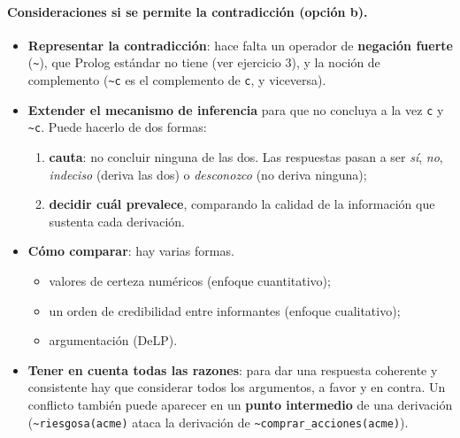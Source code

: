 \documentclass[11pt,a4paper]{article}
\newcommand{\nf}{\textasciitilde}
\begin{document}
\paragraph{Consideraciones si se permite la contradicción (opción b).}
\begin{itemize}
  \item \textbf{Representar la contradicción}: hace falta un operador de \textbf{negación fuerte} (\texttt{\nf}), que Prolog estándar no tiene (ver ejercicio 3), y la noción de complemento (\texttt{\nf c} es el complemento de \texttt{c}, y viceversa).
  \item \textbf{Extender el mecanismo de inferencia} para que no concluya a la vez \texttt{c} y \texttt{\nf c}. Puede hacerlo de dos formas:
  \begin{enumerate}
    \item \textbf{cauta}: no concluir ninguna de las dos. Las respuestas pasan a ser \textit{sí}, \textit{no}, \textit{indeciso} (deriva las dos) o \textit{desconozco} (no deriva ninguna);
    \item \textbf{decidir cuál prevalece}, comparando la calidad de la información que sustenta cada derivación.
  \end{enumerate}
  \item \textbf{Cómo comparar}: hay varias formas.
  \begin{itemize}
    \item valores de certeza numéricos (enfoque cuantitativo);
    \item un orden de credibilidad entre informantes (enfoque cualitativo);
    \item argumentación (DeLP).
  \end{itemize}
  \item \textbf{Tener en cuenta todas las razones}: para dar una respuesta coherente y consistente hay que considerar todos los argumentos, a favor y en contra. Un conflicto también puede aparecer en un \textbf{punto intermedio} de una derivación (\texttt{\nf riesgosa(acme)} ataca la derivación de \texttt{\nf comprar\_acciones(acme)}).
\end{itemize}
\end{document}
